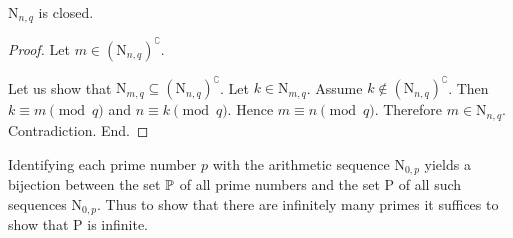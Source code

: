 \documentclass{article}
\newcommand{\N}{\mathrm{N}}
\newcommand{\Ps}{\mathrm{P}}
\begin{document}
  \begin{forthel}
    \begin{lemma}
      $\N_{n, q}$ is closed.
    \end{lemma}
    \begin{proof}
      Let $m \in (\N_{n, q})^{\complement}$.

      Let us show that $\N_{m, q} \subseteq (\N_{n, q})^{\complement}$.
        Let $k \in \N_{m, q}$.
        Assume $k \notin (\N_{n, q})^{\complement}$.
        Then $k \equiv m \pmod{q}$ and $n \equiv k \pmod{q}$.
        Hence $m \equiv n \pmod{q}$.
        Therefore $m \in \N_{n, q}$.
        Contradiction.
      End.
    \end{proof}
  \end{forthel}

  Identifying each prime number $p$ with the arithmetic sequence $\N_{0, p}$
  yields a bijection between the set $\mathbb{P}$ of all prime numbers and the set
  $\Ps$ of all such sequences $\N_{0, p}$.
  Thus to show that there are infinitely many primes it suffices to show that
  $\Ps$ is infinite.
\end{document}
